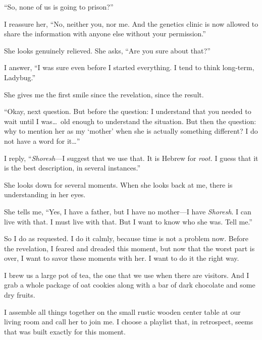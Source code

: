 \enquote{So, none of us is going to prison?}

I reassure her, \enquote{No, neither you, nor me. And the genetics clinic is now allowed to share the information with anyone else without your permission.}

She looks genuinely relieved. She asks, \enquote{Are you sure about that?}

I answer, \enquote{I was sure even before I started everything. I tend to think long-term, Ladybug.}

She gives me the first smile since the revelation, since the result.

\enquote{Okay, next question. But before the question: I understand that you needed to wait until I was\dots~old enough to understand the situation. But then the question: why to mention her as my \enquote{mother} when she is actually something different? I do not have a word for it\dots{}}

I reply, \enquote{\emph{Shoresh}---I suggest that we use that. It is Hebrew for \emph{root.} I guess that it is the best description, in several instances.}

She looks down for several moments. When she looks back at me, there is understanding in her eyes. 

She tells me, \enquote{Yes, I have a father, but I have no mother---I have \emph{Shoresh}. I can live with that. I must live with that. But I want to know who she was. Tell me.}

So I do as requested. I do it calmly, because time is not a problem now. Before the revelation, I feared and dreaded this moment, but now that the worst part is over, I want to savor these moments with her. I want to do it the right way.

I brew us a large pot of tea, the one that we use when there are visitors. And I grab a whole package of oat cookies along with a bar of dark chocolate and some dry fruits.

I assemble all things together on the small rustic wooden center table at our living room and call her to join me. I choose a playlist that, in retrospect, seems that was built exactly for this moment. 
